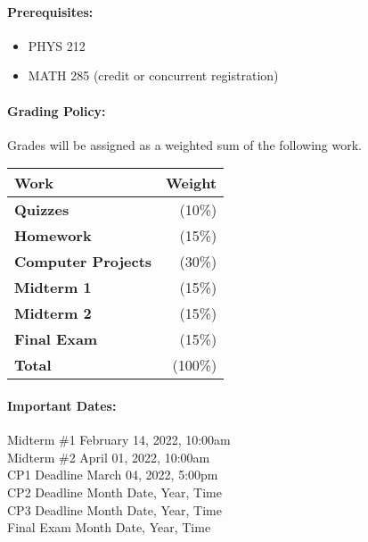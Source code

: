 \documentclass[11pt, a4paper]{article}
\begin{document}
\paragraph{Prerequisites:}
\begin{itemize}
\item PHYS 212
\item MATH 285 (credit or concurrent registration)
\end{itemize}

\paragraph{Grading Policy:} Grades will be assigned as a weighted sum of the following work.

\begin{table}[h]
\begin{tabularx}{\textwidth}{Xr}
\textbf{Work} & \textbf{Weight}\\
\hline
\textbf{Quizzes} & (10\%) \\
\textbf{Homework} & (15\%) \\
\textbf{Computer Projects} & (30\%) \\
\textbf{Midterm 1} & (15\%) \\
\textbf{Midterm 2} & (15\%) \\
\textbf{Final Exam} & (15\%) \\
\hline
\textbf{Total} & (100\%) \\
\end{tabularx}
\end{table}

\paragraph{Important Dates:}
\begin{center} \begin{minipage}{3.8in}
\begin{flushleft}
Midterm \#1       \dotfill February 14, 2022, 10:00am  \\
Midterm \#2       \dotfill April 01, 2022, 10:00am  \\
CP1 Deadline      \dotfill March 04, 2022, 5:00pm  \\
CP2 Deadline      \dotfill Month Date, Year, Time  \\
CP3 Deadline      \dotfill Month Date, Year, Time  \\
Final Exam        \dotfill Month Date, Year, Time  \\
\end{flushleft}
\end{minipage}
\end{center}
\end{document}
